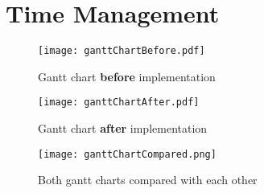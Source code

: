 \section{Time Management}
\begin{figure}[ht]
	\centering
	\texttt{[image: ganttChartBefore.pdf]}
	\caption{Gantt chart \textbf{before} implementation}
	\label{img:ganttChartBefore}
\end{figure}
\begin{figure}[ht]
	\centering
	\texttt{[image: ganttChartAfter.pdf]}
	\caption{Gantt chart \textbf{after} implementation}
	\label{img:ganttChartAfter}
\end{figure}
\begin{figure}[ht]
	\centering
	\texttt{[image: ganttChartCompared.png]}
	\caption{Both gantt charts compared with each other}
	\label{img:ganttChartCompared}
\end{figure}